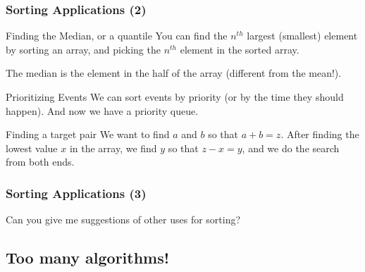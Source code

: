\documentclass{beamer}
\begin{document}
\begin{frame}
  \frametitle{Sorting Applications (2)}
  \begin{block}{Finding the Median, or a quantile}
    You can find the $n^{th}$ largest (smallest) element by sorting an
    array, and picking the $n^{th}$ element in the sorted array.

    The median is the element in the half of the array (different from
    the mean!).
  \end{block}
  
  \begin{block}{Prioritizing Events}
    We can sort events by priority (or by the time they should
    happen). And now we have a priority queue.
  \end{block}

  \begin{block}{Finding a target pair}
    We want to find $a$ and $b$ so that $a+b=z$. After finding the
    lowest value $x$ in the array, we find $y$ so that $z - x = y$,
    and we do the search from both ends.
  \end{block}
\end{frame}

\begin{frame}
  \frametitle{Sorting Applications (3)}
  Can you give me suggestions of other uses for sorting?
\end{frame}


\subsection{Too many algorithms!}
\end{document}
